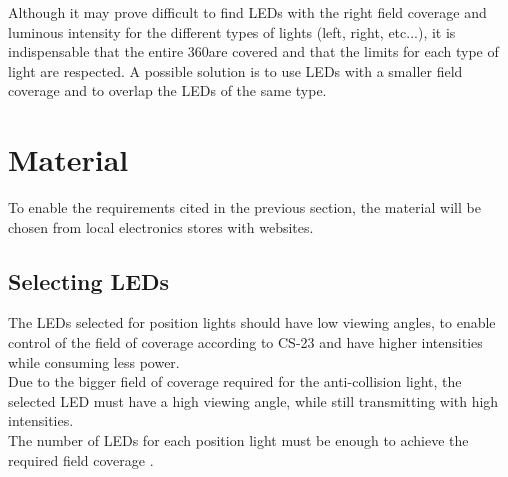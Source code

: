 Although it may prove difficult to find LEDs with the right field coverage and luminous intensity for the different types of lights (left, right, etc...), it is indispensable that the entire 360\degree are covered and that the limits for each type of light are respected. A possible solution is to use LEDs with a smaller field coverage and to overlap the LEDs of the same type.\\

\section{Material}
\label{section:pmaterial}

To enable the requirements cited in the previous section, the material will be chosen from local electronics stores with websites.\\

\subsection{Selecting LEDs}
The LEDs selected for position lights should have low viewing angles, to enable control of the field of coverage according to CS-23 \citep{Easa2012} and have higher intensities while consuming less power.\\
Due to the bigger field of coverage required for the anti-collision light, the selected LED must have a high viewing angle, while still transmitting with high intensities.\\
The number of LEDs for each position light must be enough to achieve the required field coverage \citep{Easa2012}.\\

